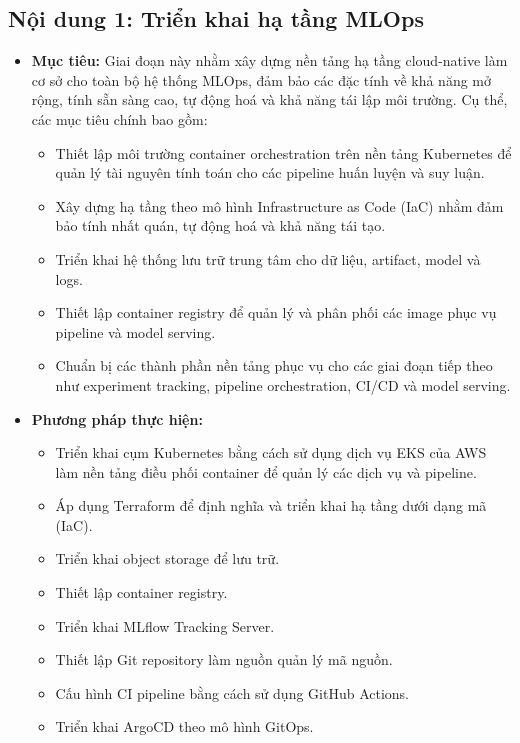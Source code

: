 

\subsection{Nội dung 1: Triển khai hạ tầng MLOps}

\begin{itemize}
    \item \textbf{Mục tiêu:}
    Giai đoạn này nhằm xây dựng nền tảng hạ tầng cloud-native làm cơ sở cho toàn bộ hệ thống MLOps, đảm bảo các đặc tính về khả năng mở rộng, tính sẵn sàng cao, tự động hoá và khả năng tái lập môi trường. Cụ thể, các mục tiêu chính bao gồm: 

        \begin{itemize}
        \item Thiết lập môi trường container orchestration trên nền tảng Kubernetes để quản lý tài nguyên tính toán cho các pipeline huấn luyện và suy luận.
        \item Xây dựng hạ tầng theo mô hình Infrastructure as Code (IaC) nhằm đảm bảo tính nhất quán, tự động hoá và khả năng tái tạo.
        \item Triển khai hệ thống lưu trữ trung tâm cho dữ liệu, artifact, model và logs.
        \item Thiết lập container registry để quản lý và phân phối các image phục vụ pipeline và model serving.
        \item Chuẩn bị các thành phần nền tảng phục vụ cho các giai đoạn tiếp theo như experiment tracking, pipeline orchestration, CI/CD và model serving.
    \end{itemize}

    \item \textbf{Phương pháp thực hiện:}
        \begin{itemize}
            \item Triển khai cụm Kubernetes bằng cách sử dụng dịch vụ EKS của AWS làm nền tảng điều phối container để quản lý các dịch vụ và pipeline.
            \item Áp dụng Terraform để định nghĩa và triển khai hạ tầng dưới dạng mã (IaC).
            \item Triển khai object storage để lưu trữ.
            \item Thiết lập container registry.
            \item Triển khai MLflow Tracking Server.
            \item Thiết lập Git repository làm nguồn quản lý mã nguồn.
            \item Cấu hình CI pipeline bằng cách sử dụng GitHub Actions.
            \item Triển khai ArgoCD theo mô hình GitOps.
        \end{itemize}
\end{itemize}

